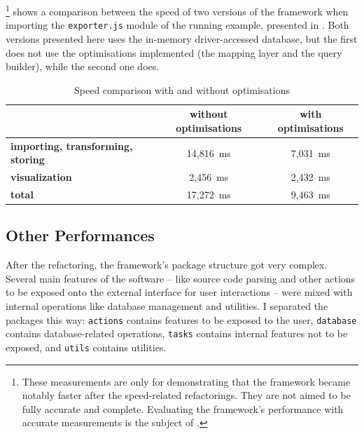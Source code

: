 \footnote{These measurements are only for demonstrating that the framework became notably faster after the speed-related refactorings. They are not aimed to be fully accurate and complete. Evaluating the framework's performance with accurate measurements is the subject of .} shows a comparison between the speed of two versions of the framework when importing the \lstinline{exporter.js} module of the running example, presented in . Both versions presented here uses the in-memory driver-accessed database, but the first does not use the optimisations implemented (the mapping layer and the query builder), while the second one does.

\begin{table}[!htb]
	\centering
	\begin{tabular}{l|cc}
		\toprule
																								&   \textbf{without optimisations}     &   \textbf{with optimisations}   \\
		\midrule
		\textbf{importing, transforming, storing}   &   14,816~ms                          &   7,031~ms                      \\
		\textbf{visualization}                      &   2,456~ms                           &   2,432~ms                      \\
		\midrule
		\textbf{total}                              &   17,272~ms                          &   9,463~ms                      \\
		\bottomrule
	\end{tabular}

	\caption{Speed comparison with and without optimisations}
	\label{table:results-of-query-optimisations}
\end{table}


\subsection{Other Performances}

After the refactoring, the framework's package structure got very complex. Several main features of the software – like source code parsing and other actions to be exposed onto the external interface for user interactions – were mixed with internal operations like database management and utilities. I separated the packages this way: \lstinline{actions} contains features to be exposed to the user, \lstinline{database} contains database-related operations, \lstinline{tasks} contains internal features not to be exposed, and \lstinline{utils} contains utilities.

